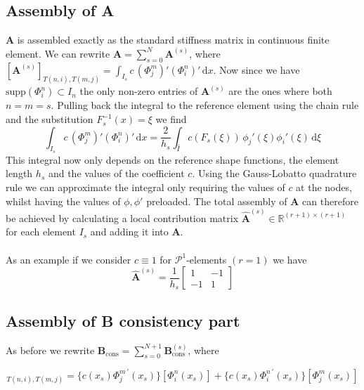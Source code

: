 \subsection{Assembly of A}
$\textbf{A}$ is assembled exactly as the standard stiffness matrix in continuous finite element.
We can rewrite $\textbf{A} = \sum_{s=0}^{N} \textbf{A}^{(s)}$, where 
$[\textbf{A}^{(s)}]_{T(n,i),T(m,j)} = \int_{I_s} c \,(\Phi_j^m)' (\Phi_i^n)' \, \text{d}x$.
Now since we have $\text{supp}(\Phi_i^n)\subset I_n$ the only non-zero entries of $\textbf{A}^{(s)} $ are the ones where both $n=m=s$. Pulling back the integral 
to the reference element using the chain rule and the substitution $F_s^{-1}(x) = \xi$ we find
\begin{equation*}
    \int_{I_s} c \,(\Phi_j^m)' (\Phi_i^n)' \, \text{d}x = 
    \frac{2}{h_s} \int_{\hat{I}} c(F_s(\xi)) \, \phi_j'(\xi) \phi_i'(\xi) \, \text{d}\xi
\end{equation*}
This integral now only depends on the reference shape functions, the element length $h_s$
and the values of the coefficient $c$. Using the Gauss-Lobatto quadrature rule we can approximate the integral
only requiring the values of $c$ at the nodes, whilst having the values of $\phi, \phi'$ preloaded.
The total assembly of $\textbf{A}$ can therefore be achieved by calculating a local contribution matrix 
$\widehat{\textbf{A}}^{(s)} \in \mathbb{R}^{(r+1)\times (r+1)}$ for each element $I_s$ and adding it into $\textbf{A}$. \\ \\
As an example if we consider $c\equiv 1$ for $\mathcal{P}^1$-elements $(r=1)$ we have 
\begin{equation*}
    \widehat{\textbf{A}}^{(s)} = \frac{1}{h_s}
    \begin{bmatrix}
         1  & -1 \\
        -1  &  1 
    \end{bmatrix}
\end{equation*}

\subsection{Assembly of B consistency part}
As before we rewrite $\textbf{B}_{\text{cons}} = \sum_{s=0}^{N+1} \textbf{B}_{\text{cons}}^{(s)} $, where 

\begin{equation*}
    [\textbf{B}_{\text{cons}}^{(s)}]_{T(n,i),T(m,j)} = \{c(x_s) \Phi_j^{m \, \prime} (x_s)\}[\Phi_i^n(x_s)] + \{c(x_s)\Phi_i^{n\, \prime} (x_s)\}[\Phi_j^m(x_s)]
\end{equation*}

